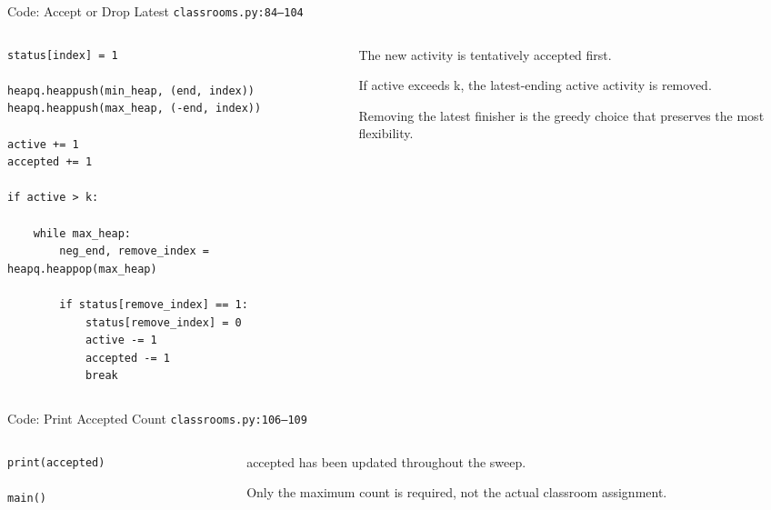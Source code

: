 \documentclass[aspectratio=169,11pt]{beamer}
\begin{document}
\begin{frame}[fragile]{Code: Accept or Drop Latest}
\scriptsize
{} \texttt{classrooms.py:84--104}

\vspace{0.08cm}
\begin{columns}[T,totalwidth=\textwidth]
\begin{column}{0.58\textwidth}
\begin{lstlisting}[style=cpcode]
status[index] = 1

heapq.heappush(min_heap, (end, index))
heapq.heappush(max_heap, (-end, index))

active += 1
accepted += 1

if active > k:

    while max_heap:
        neg_end, remove_index = heapq.heappop(max_heap)

        if status[remove_index] == 1:
            status[remove_index] = 0
            active -= 1
            accepted -= 1
            break
\end{lstlisting}
\end{column}
\begin{column}{0.38\textwidth}
\begin{tightitemize}
  \item The new activity is tentatively accepted first.
  \item If active exceeds k, the latest-ending active activity is removed.
  \item Removing the latest finisher is the greedy choice that preserves the most flexibility.
\end{tightitemize}
\end{column}
\end{columns}
\end{frame}

\begin{frame}[fragile]{Code: Print Accepted Count}
\scriptsize
{} \texttt{classrooms.py:106--109}

\vspace{0.08cm}
\begin{columns}[T,totalwidth=\textwidth]
\begin{column}{0.58\textwidth}
\begin{lstlisting}[style=cpcode]
    print(accepted)

main()
\end{lstlisting}
\end{column}
\begin{column}{0.38\textwidth}
\begin{tightitemize}
  \item accepted has been updated throughout the sweep.
  \item Only the maximum count is required, not the actual classroom assignment.
\end{tightitemize}
\end{column}
\end{columns}
\end{frame}
\end{document}

